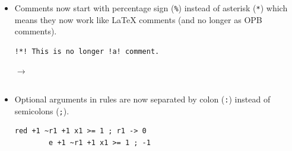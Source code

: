 \documentclass[a4paper]{article}
\newcommand{\veriPB}[0]{\textsc{VeriPB}}
\begin{document}
\begin{itemize}
\begin{minipage}{.47\linewidth}
	      \end{minipage}\hfill%
	      \begin{minipage}[t]{.05\linewidth}
		      \centering \vspace*{-5mm}$\to$
	      \end{minipage}\hfill%
	      \hfill%
	      \begin{minipage}{.47\linewidth}
		      \begin{lstlisting}[language=veripb, gobble=8, rulecolor=\color{veripb-valid-text}, caption={\veriPB{} 3.0 syntax.}]
		pol 1 2 +;
		\end{lstlisting}
	      \end{minipage}
	\item Comments now start with percentage sign (\lstinline[language=veripb]!%!) instead of asterisk (\verb!*!) which means they now work like \LaTeX{} comments (and no longer as OPB comments).
	      \\[1mm]
	      \begin{minipage}{.47\linewidth}
		      \begin{lstlisting}[language=veripb, gobble=8, rulecolor=\color{veripb-invalid-text}, caption={\veriPB{} 2.0 syntax.}]
		!*! This is no longer !a! comment.
		\end{lstlisting}
	      \end{minipage}\hfill%
	      \begin{minipage}[t]{.05\linewidth}
		      \centering \vspace*{-5mm}$\to$
	      \end{minipage}\hfill%
	      \hfill%
	      \begin{minipage}{.47\linewidth}
		      \begin{lstlisting}[language=veripb, gobble=8, rulecolor=\color{veripb-valid-text}, caption={\veriPB{} 3.0 syntax.}]
		% This is now a comment.
		\end{lstlisting}
	      \end{minipage}
	\item Optional arguments in rules are now separated by colon (\verb!:!) instead of semicolons (\verb!;!).
	      \\[1mm]
	      \begin{minipage}{.47\linewidth}
		      \begin{lstlisting}[language=veripb, gobble=8, rulecolor=\color{veripb-invalid-text}, caption={\veriPB{} 2.0 syntax.}]
		red +1 ~r1 +1 x1 >= 1 ; r1 -> 0
		e +1 ~r1 +1 x1 >= 1 ; -1
		\end{lstlisting}
	      \end{minipage}\hfill%

\end{itemize}
\end{document}
